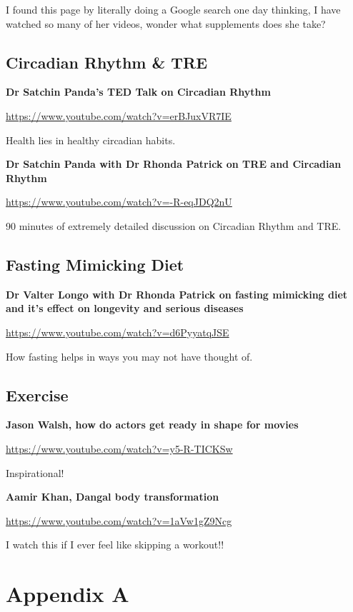 \documentclass[
  oneside]{book}
\begin{document}
I found this page by literally doing a Google search one day thinking, I have watched so many of her videos, wonder what supplements does she take?

\hypertarget{circadian-rhythm-tre}{%
\section{Circadian Rhythm \& TRE}\label{circadian-rhythm-tre}}

\textbf{Dr Satchin Panda's TED Talk on Circadian Rhythm}

\url{https://www.youtube.com/watch?v=erBJuxVR7IE}

Health lies in healthy circadian habits.

\textbf{Dr Satchin Panda with Dr Rhonda Patrick on TRE and Circadian Rhythm}

\url{https://www.youtube.com/watch?v=-R-eqJDQ2nU}

90 minutes of extremely detailed discussion on Circadian Rhythm and TRE.

\hypertarget{fasting-mimicking-diet}{%
\section{Fasting Mimicking Diet}\label{fasting-mimicking-diet}}

\textbf{Dr Valter Longo with Dr Rhonda Patrick on fasting mimicking diet and it's effect on longevity and serious diseases}

\url{https://www.youtube.com/watch?v=d6PyyatqJSE}

How fasting helps in ways you may not have thought of.

\hypertarget{exercise}{%
\section{Exercise}\label{exercise}}

\textbf{Jason Walsh, how do actors get ready in shape for movies}

\url{https://www.youtube.com/watch?v=y5-R-TICKSw}

Inspirational!

\textbf{Aamir Khan, Dangal body transformation}

\url{https://www.youtube.com/watch?v=1aVw1gZ9Ncg}

I watch this if I ever feel like skipping a workout!!

\hypertarget{appendix-a}{%
\chapter{Appendix A}\label{appendix-a}}
\end{document}
